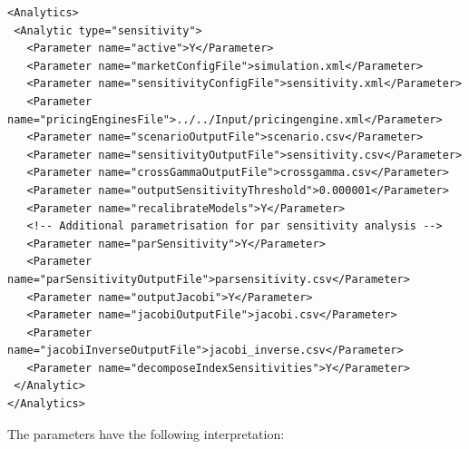 \begin{listing}[H]
\begin{verbatim}
<Analytics>
 <Analytic type="sensitivity">
   <Parameter name="active">Y</Parameter>
   <Parameter name="marketConfigFile">simulation.xml</Parameter>
   <Parameter name="sensitivityConfigFile">sensitivity.xml</Parameter>
   <Parameter name="pricingEnginesFile">../../Input/pricingengine.xml</Parameter>
   <Parameter name="scenarioOutputFile">scenario.csv</Parameter>
   <Parameter name="sensitivityOutputFile">sensitivity.csv</Parameter>
   <Parameter name="crossGammaOutputFile">crossgamma.csv</Parameter>
   <Parameter name="outputSensitivityThreshold">0.000001</Parameter>
   <Parameter name="recalibrateModels">Y</Parameter>
   <!-- Additional parametrisation for par sensitivity analysis -->
   <Parameter name="parSensitivity">Y</Parameter>
   <Parameter name="parSensitivityOutputFile">parsensitivity.csv</Parameter>
   <Parameter name="outputJacobi">Y</Parameter>
   <Parameter name="jacobiOutputFile">jacobi.csv</Parameter>
   <Parameter name="jacobiInverseOutputFile">jacobi_inverse.csv</Parameter>
   <Parameter name="decomposeIndexSensitivities">Y</Parameter>
 </Analytic>
</Analytics>
\end{verbatim}
\caption{ORE analytic: sensitivity}
\label{lst:ore_sensitivity}
\end{listing}

The parameters have the following interpretation:

